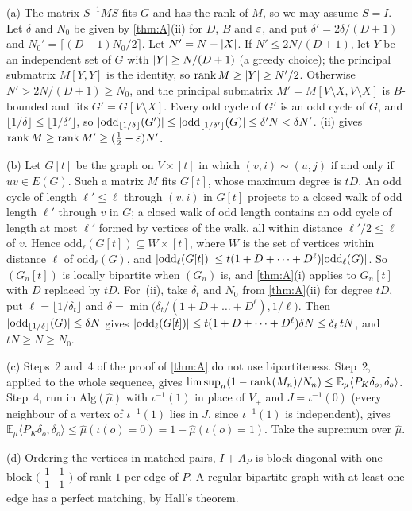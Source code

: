 \begin{informalproof}
(a) The matrix $S^{-1}MS$ fits $G$ and has the rank of $M$, so we may assume $S=I$. Let $\delta$ and $N_0$ be given by
\cref{thm:A}(ii) for $D$, $B$ and $\varepsilon$, and put $\delta'=2\delta/(D+1)$ and $N_0'=\lceil(D+1)N_0/2\rceil$. Let
$N'=N-\lvert X \rvert$. If $N'\le2N/(D+1)$, let $Y$ be an independent set of $G$ with $\lvert Y \rvert\ge N/(D+1)$ (a greedy choice);
the principal submatrix $M[Y,Y]$ is the identity, so $\operatorname{rank} M\ge\lvert Y \rvert\ge N'/2$. Otherwise $N'>2N/(D+1)\ge N_0$, and
the principal submatrix $M'=M[V\setminus X,V\setminus X]$ is $B$-bounded and fits $G'=G[V\setminus X]$. Every odd cycle
of $G'$ is an odd cycle of $G$, and $\lfloor1/\delta\rfloor\le\lfloor1/\delta'\rfloor$, so
$\lvert \mathrm{odd}_{\lfloor1/\delta\rfloor}(G') \rvert\le\lvert \mathrm{odd}_{\lfloor1/\delta'\rfloor}(G) \rvert\le\delta'N<\delta N'$.
(ii) gives $\operatorname{rank} M\ge\operatorname{rank} M'\ge(\frac12-\varepsilon)N'$.

(b) Let $G[t]$ be the graph on $V\times[t]$ in which $(v,i)\sim(u,j)$ if and only if $uv\in E(G)$. Such a matrix $M$
fits $G[t]$, whose maximum degree is $tD$. An odd cycle of length $\ell'\le\ell$ through $(v,i)$ in $G[t]$ projects to a
closed walk of odd length $\ell'$ through $v$ in $G$; a closed walk of odd length contains an odd cycle of length at
most $\ell'$ formed by vertices of the walk, all within distance $\ell'/2\le\ell$ of $v$. Hence
$\mathrm{odd}_\ell(G[t])\subseteq W\times[t]$, where $W$ is the set of vertices within distance $\ell$ of
$\mathrm{odd}_\ell(G)$, and $\lvert \mathrm{odd}_\ell(G[t]) \rvert\le t(1+D+\dots+D^\ell)\lvert \mathrm{odd}_\ell(G) \rvert$. So
$(G_n[t])$ is locally bipartite when $(G_n)$ is, and \cref{thm:A}(i) applies to $G_n[t]$ with $D$ replaced by $tD$.
For~(ii), take $\delta_t$ and $N_0$ from \cref{thm:A}(ii) for degree $tD$, put $\ell=\lfloor1/\delta_t\rfloor$ and
$\delta=\min\bigl(\delta_t/(1+D+\dots+D^\ell),1/\ell\bigr)$. Then $\lvert \mathrm{odd}_{\lfloor1/\delta\rfloor}(G) \rvert\le\delta N$
gives $\lvert \mathrm{odd}_\ell(G[t]) \rvert\le t(1+D+\dots+D^\ell)\delta N\le\delta_t\,tN$, and $tN\ge N\ge N_0$.

(c) Steps~2 and~4 of the proof of \cref{thm:A} do not use bipartiteness. Step~2, applied to the whole sequence, gives
$\limsup_n(1-\operatorname{rank}(M_n)/N_n)\le\mathbb{E}_\mu\langle P_K\delta_o,\delta_o\rangle$. Step~4, run in
$\mathrm{Alg}(\hat\mu)$ with $\iota^{-1}(1)$ in place of $V_+$ and $J=\iota^{-1}(0)$ (every neighbour of a vertex of
$\iota^{-1}(1)$ lies in $J$, since $\iota^{-1}(1)$ is independent), gives $\mathbb{E}_\mu\langle P_K\delta_o,\delta_o\rangle\le\hat\mu(\iota(o)=0)
=1-\hat\mu(\iota(o)=1)$. Take the supremum over $\hat\mu$.

(d) Ordering the vertices in matched pairs, $I+A_P$ is block diagonal with one block
$\bigl(\begin{smallmatrix}1&1\\1&1\end{smallmatrix}\bigr)$ of rank $1$ per edge of $P$. A regular bipartite graph with
at least one edge has a perfect matching, by Hall's theorem.
\end{informalproof}

